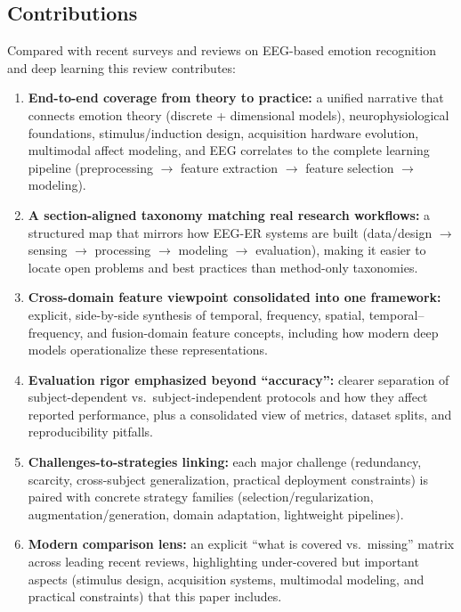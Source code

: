 \documentclass{WileyMSP-template}
\begin{document}
\subsection{Contributions}
Compared with recent surveys and reviews on EEG-based emotion recognition and deep learning
this review contributes:

\begin{enumerate}
  \item \textbf{End-to-end coverage from theory to practice:}
  a unified narrative that connects emotion theory (discrete + dimensional models), neurophysiological foundations,
  stimulus/induction design, acquisition hardware evolution, multimodal affect modeling, and EEG correlates to the
  complete learning pipeline (preprocessing $\rightarrow$ feature extraction $\rightarrow$ feature selection $\rightarrow$ modeling).

  \item \textbf{A section-aligned taxonomy matching real research workflows:}
  a structured map that mirrors how EEG-ER systems are built (data/design $\rightarrow$ sensing $\rightarrow$ processing $\rightarrow$ modeling $\rightarrow$ evaluation),
  making it easier to locate open problems and best practices than method-only taxonomies.

  \item \textbf{Cross-domain feature viewpoint consolidated into one framework:}
  explicit, side-by-side synthesis of temporal, frequency, spatial, temporal--frequency, and fusion-domain feature concepts,
  including how modern deep models operationalize these representations.

  \item \textbf{Evaluation rigor emphasized beyond “accuracy”:}
  clearer separation of subject-dependent vs.\ subject-independent protocols and how they affect reported performance,
  plus a consolidated view of metrics, dataset splits, and reproducibility pitfalls.

  \item \textbf{Challenges-to-strategies linking:}
  each major challenge (redundancy, scarcity, cross-subject generalization, practical deployment constraints)
  is paired with concrete strategy families (selection/regularization, augmentation/generation, domain adaptation, lightweight pipelines).

  \item \textbf{Modern comparison lens:}
  an explicit “what is covered vs.\ missing” matrix across leading recent reviews, highlighting under-covered but important
  aspects (stimulus design, acquisition systems, multimodal modeling, and practical constraints) that this paper includes.
\end{enumerate}
\end{document}
